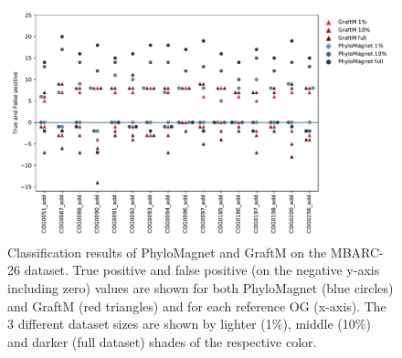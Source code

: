 \documentclass[a4paper]{article}
\begin{document}
\begin{figure}[!tpb]%
\centerline{\includegraphics[width=.7\textwidth]{Fig2.pdf}}
\caption{Classification results of PhyloMagnet and GraftM on the MBARC-26 dataset. True positive and false positive (on the negative y-axis including zero) values are shown for both PhyloMagnet (blue circles) and GraftM (red triangles) and for each reference OG (x-axis). The 3 different dataset sizes are shown by lighter (1\%), middle (10\%) and darker (full dataset) shades of the respective color.} \label{fig:02}
\end{figure}
\end{document}
